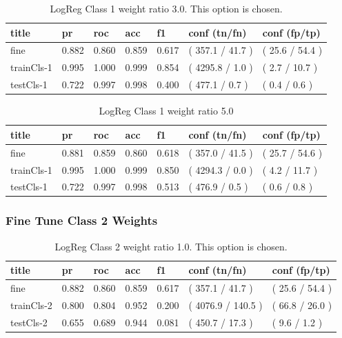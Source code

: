\documentclass[ms]{nuthesis}
\begin{document}
\FloatBarrier
\begin{table}[H]
\centering
\begin{tabular}{|l||l||l||l||l||l||l|}\toprule
title & pr & roc & acc & f1 & conf (tn/fn) & conf (fp/tp) \\ \midrule
fine & 0.882 & 0.860 & 0.859 & 0.617 & ( 357.1 / 41.7 ) & ( 25.6 / 54.4 ) \\
trainCls-1 & 0.995 & 1.000 & 0.999 & 0.854 & ( 4295.8 / 1.0 ) & ( 2.7 / 10.7 ) \\
testCls-1 & 0.722 & 0.997 & 0.998 & 0.400 & ( 477.1 / 0.7 ) & ( 0.4 / 0.6 ) \\ \bottomrule
\end{tabular}
\caption{LogReg Class 1 weight ratio 3.0. This option is chosen.}
\label{tab:LogRegCls1-Wt3}
\end{table}
\FloatBarrier

\FloatBarrier
\begin{table}[H]
\centering
\begin{tabular}{|l||l||l||l||l||l||l|}\toprule
title & pr & roc & acc & f1 & conf (tn/fn) & conf (fp/tp) \\ \midrule
fine & 0.881 & 0.859 & 0.860 & 0.618 & ( 357.0 / 41.5 ) & ( 25.7 / 54.6 ) \\
trainCls-1 & 0.995 & 1.000 & 0.999 & 0.850 & ( 4294.3 / 0.0 ) & ( 4.2 / 11.7 ) \\
testCls-1 & 0.722 & 0.997 & 0.998 & 0.513 & ( 476.9 / 0.5 ) & ( 0.6 / 0.8 ) \\ \bottomrule
\end{tabular}
\caption{LogReg Class 1 weight ratio 5.0}
\label{tab:LogRegCls1-Wt5}
\end{table}
\FloatBarrier


\subsubsection{Fine Tune Class 2 Weights}
\FloatBarrier
\begin{table}[H]
\centering
\begin{tabular}{|l||l||l||l||l||l||l|}\toprule
title & pr & roc & acc & f1 & conf (tn/fn) & conf (fp/tp) \\ \midrule
fine & 0.882 & 0.860 & 0.859 & 0.617 & ( 357.1 / 41.7 ) & ( 25.6 / 54.4 ) \\
trainCls-2 & 0.800 & 0.804 & 0.952 & 0.200 & ( 4076.9 / 140.5 ) & ( 66.8 / 26.0 ) \\
testCls-2 & 0.655 & 0.689 & 0.944 & 0.081 & ( 450.7 / 17.3 ) & ( 9.6 / 1.2 ) \\ \bottomrule
\end{tabular}
\caption{LogReg Class 2 weight ratio 1.0. This option is chosen.}
\label{tab:LogRegCls2-Wt1}
\end{table}
\FloatBarrier
\end{document}
